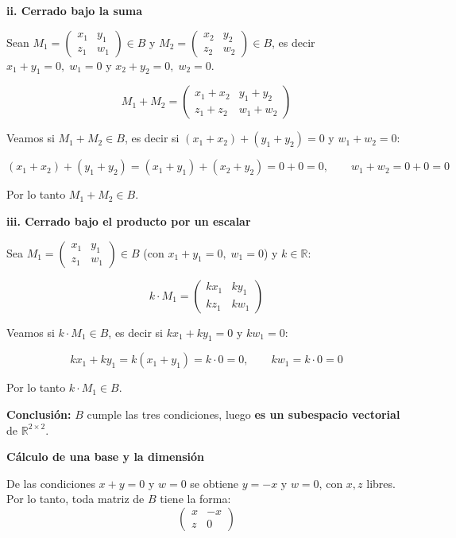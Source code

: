 \documentclass[12pt]{article}
\begin{document}
\begin{enumerate}[label=\alph*.-]
    \textbf{ii. Cerrado bajo la suma}

    Sean $M_1=\begin{pmatrix}x_1 & y_1\\ z_1 & w_1\end{pmatrix} \in B$ y $M_2=\begin{pmatrix}x_2 & y_2\\ z_2 & w_2\end{pmatrix} \in B$, es decir $x_1+y_1=0,\; w_1=0$ y $x_2+y_2=0,\; w_2=0$.

    \[
    M_1+M_2 = \begin{pmatrix}x_1+x_2 & y_1+y_2\\ z_1+z_2 & w_1+w_2\end{pmatrix}
    \]

    Veamos si $M_1+M_2 \in B$, es decir si $(x_1+x_2)+(y_1+y_2)=0$ y $w_1+w_2=0$:

    \[
    (x_1+x_2)+(y_1+y_2) = (x_1+y_1)+(x_2+y_2) = 0+0=0, \qquad w_1+w_2 = 0+0=0
    \]

    Por lo tanto $M_1+M_2 \in B$.

    \textbf{iii. Cerrado bajo el producto por un escalar}

    Sea $M_1=\begin{pmatrix}x_1 & y_1\\ z_1 & w_1\end{pmatrix}\in B$ (con $x_1+y_1=0,\; w_1=0$) y $k \in \mathbb{R}$:

    \[
    k\cdot M_1 = \begin{pmatrix}kx_1 & ky_1\\ kz_1 & kw_1\end{pmatrix}
    \]

    Veamos si $k\cdot M_1 \in B$, es decir si $kx_1+ky_1=0$ y $kw_1=0$:

    \[
    kx_1+ky_1 = k(x_1+y_1) = k\cdot 0=0, \qquad kw_1 = k\cdot 0=0
    \]

    Por lo tanto $k\cdot M_1 \in B$.

    \textbf{Conclusión:} $B$ cumple las tres condiciones, luego \textbf{es un subespacio vectorial} de $\mathbb{R}^{2\times2}$.

    \textbf{Cálculo de una base y la dimensión}

    De las condiciones $x+y=0$ y $w=0$ se obtiene $y=-x$ y $w=0$, con $x,z$ libres. Por lo tanto, toda matriz de $B$ tiene la forma:
    \[
    \begin{pmatrix} x & -x \\ z & 0 \end{pmatrix}
    \]


\end{enumerate}
\end{document}
